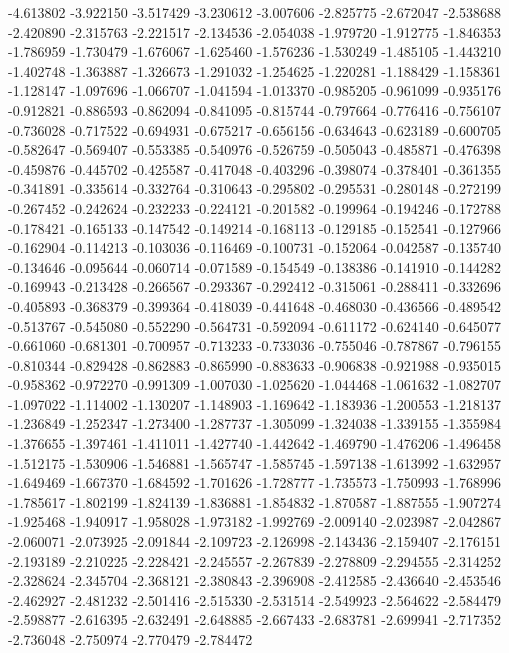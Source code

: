 -4.613802
-3.922150
-3.517429
-3.230612
-3.007606
-2.825775
-2.672047
-2.538688
-2.420890
-2.315763
-2.221517
-2.134536
-2.054038
-1.979720
-1.912775
-1.846353
-1.786959
-1.730479
-1.676067
-1.625460
-1.576236
-1.530249
-1.485105
-1.443210
-1.402748
-1.363887
-1.326673
-1.291032
-1.254625
-1.220281
-1.188429
-1.158361
-1.128147
-1.097696
-1.066707
-1.041594
-1.013370
-0.985205
-0.961099
-0.935176
-0.912821
-0.886593
-0.862094
-0.841095
-0.815744
-0.797664
-0.776416
-0.756107
-0.736028
-0.717522
-0.694931
-0.675217
-0.656156
-0.634643
-0.623189
-0.600705
-0.582647
-0.569407
-0.553385
-0.540976
-0.526759
-0.505043
-0.485871
-0.476398
-0.459876
-0.445702
-0.425587
-0.417048
-0.403296
-0.398074
-0.378401
-0.361355
-0.341891
-0.335614
-0.332764
-0.310643
-0.295802
-0.295531
-0.280148
-0.272199
-0.267452
-0.242624
-0.232233
-0.224121
-0.201582
-0.199964
-0.194246
-0.172788
-0.178421
-0.165133
-0.147542
-0.149214
-0.168113
-0.129185
-0.152541
-0.127966
-0.162904
-0.114213
-0.103036
-0.116469
-0.100731
-0.152064
-0.042587
-0.135740
-0.134646
-0.095644
-0.060714
-0.071589
-0.154549
-0.138386
-0.141910
-0.144282
-0.169943
-0.213428
-0.266567
-0.293367
-0.292412
-0.315061
-0.288411
-0.332696
-0.405893
-0.368379
-0.399364
-0.418039
-0.441648
-0.468030
-0.436566
-0.489542
-0.513767
-0.545080
-0.552290
-0.564731
-0.592094
-0.611172
-0.624140
-0.645077
-0.661060
-0.681301
-0.700957
-0.713233
-0.733036
-0.755046
-0.787867
-0.796155
-0.810344
-0.829428
-0.862883
-0.865990
-0.883633
-0.906838
-0.921988
-0.935015
-0.958362
-0.972270
-0.991309
-1.007030
-1.025620
-1.044468
-1.061632
-1.082707
-1.097022
-1.114002
-1.130207
-1.148903
-1.169642
-1.183936
-1.200553
-1.218137
-1.236849
-1.252347
-1.273400
-1.287737
-1.305099
-1.324038
-1.339155
-1.355984
-1.376655
-1.397461
-1.411011
-1.427740
-1.442642
-1.469790
-1.476206
-1.496458
-1.512175
-1.530906
-1.546881
-1.565747
-1.585745
-1.597138
-1.613992
-1.632957
-1.649469
-1.667370
-1.684592
-1.701626
-1.728777
-1.735573
-1.750993
-1.768996
-1.785617
-1.802199
-1.824139
-1.836881
-1.854832
-1.870587
-1.887555
-1.907274
-1.925468
-1.940917
-1.958028
-1.973182
-1.992769
-2.009140
-2.023987
-2.042867
-2.060071
-2.073925
-2.091844
-2.109723
-2.126998
-2.143436
-2.159407
-2.176151
-2.193189
-2.210225
-2.228421
-2.245557
-2.267839
-2.278809
-2.294555
-2.314252
-2.328624
-2.345704
-2.368121
-2.380843
-2.396908
-2.412585
-2.436640
-2.453546
-2.462927
-2.481232
-2.501416
-2.515330
-2.531514
-2.549923
-2.564622
-2.584479
-2.598877
-2.616395
-2.632491
-2.648885
-2.667433
-2.683781
-2.699941
-2.717352
-2.736048
-2.750974
-2.770479
-2.784472

